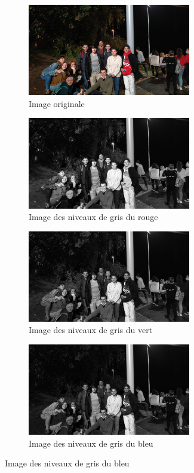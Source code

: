 \documentclass[a4paper,10pt]{article}
\begin{document}
    \begin{figure}[h]
   \begin{subfigure}{0.6\textwidth}
    \includegraphics[width=1\linewidth, height=4cm]{patinoire}
    \caption{Image originale}
    \label{fig:patinoireOrigin}
    \end{subfigure}
     \begin{subfigure}{0.6\textwidth}
    \includegraphics[width=1\linewidth, height=4cm]{patinoire_red}   
    \caption{Image des niveaux de gris du rouge}
    \label{fig:patinoireRed}
    \end{subfigure}
     \begin{subfigure}{0.6\textwidth}
    \includegraphics[width=1\linewidth, height=4cm]{patinoire_green}   
    \caption{Image des niveaux de gris du vert}
    \label{fig:patinoireGreen}
    \end{subfigure}
     \begin{subfigure}{0.6\textwidth}
    \includegraphics[width=1\linewidth, height=4cm]{patinoire_blue}   
    \caption{Image des niveaux de gris du bleu}
    \label{fig:patinoireBlue}
    \end{subfigure}
    \end{figure}
    \pagebreak
\end{document}
